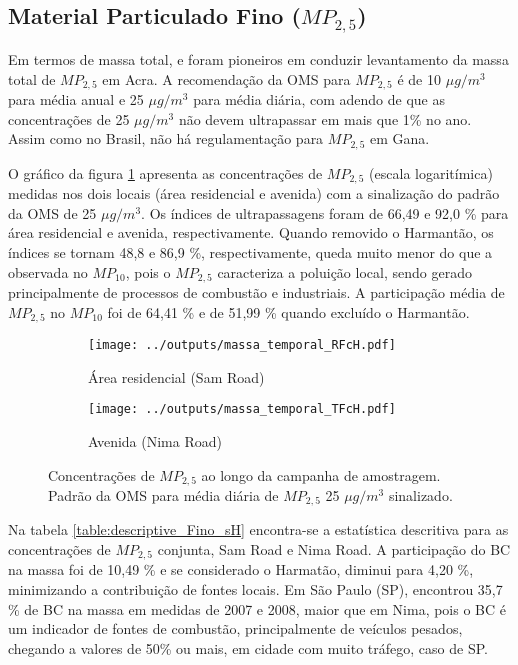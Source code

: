 \newpage
\subsection{Material Particulado Fino ($MP_{2,5}$)}

Em termos de massa total, \citet{ARKU2008} e \citet{DIONISIO2010} 
foram pioneiros em conduzir levantamento da massa total de $MP_{2,5}$ em 
Acra. A recomendação da OMS para $MP_{2,5}$ é de 10 $\mu g/m^3$ para média anual
e 25 $\mu g/m^3$ para média diária, com adendo de que as concentrações de 
25 $\mu g/m^3$ não devem ultrapassar em mais que 1\% no ano. Assim como no
Brasil, não há regulamentação para $MP_{2,5}$ em Gana. 

O gráfico da figura \ref{fig:massa_temporal_mp2.5} apresenta as concentrações
de $MP_{2,5}$ (escala logaritímica) medidas nos dois locais 
(área residencial e avenida) com a sinalização do padrão da OMS de 
25 $\mu g/m^3$. Os índices de ultrapassagens foram de 66,49 e 92,0 \% 
para área residencial e avenida, respectivamente. Quando removido o Harmantão, 
os índices se tornam 48,8 e 86,9 \%, respectivamente, queda muito menor do 
que a observada no $MP_{10}$, pois o $MP_{2,5}$ caracteriza a poluição local, 
sendo gerado principalmente de processos de combustão e industriais.
A participação média de $MP_{2,5}$ no $MP_{10}$ foi de 64,41 \% e de 
51,99 \% quando excluído o Harmantão.

\begin{figure}[H]
  \centering
  \begin{subfigure}[b]{0.45\textwidth}
    \texttt{[image: ../outputs/massa\_temporal\_RFcH.pdf]}
    \caption{Área residencial (Sam Road)}
  \end{subfigure}%
  \begin{subfigure}[b]{0.45\textwidth}
    \texttt{[image: ../outputs/massa\_temporal\_TFcH.pdf]}
    \caption{Avenida (Nima Road)}
  \end{subfigure}
  \caption{Concentrações de $MP_{2,5}$ ao longo da campanha de amostragem. 
           Padrão da OMS para média diária de $MP_{2,5}$ 25 $\mu g/m^3$ sinalizado.
           \label{fig:massa_temporal_mp2.5}}
\end{figure}

Na tabela \ref{table:descriptive_Fino_sH} encontra-se a estatística 
descritiva para as concentrações de $MP_{2,5}$ conjunta, Sam Road e Nima Road. 
A participação do BC na massa foi de 10,49 \% e se considerado 
o Harmatão, diminui para 4,20 \%, minimizando a contribuição de fontes locais.
Em São Paulo (SP), \citet{andrade2012} encontrou 35,7 \% de BC na massa em medidas
de 2007 e 2008, maior que em Nima, pois o BC é um indicador de fontes de 
combustão, principalmente de veículos pesados, chegando a valores de 50\% ou 
mais, em cidade com muito tráfego, caso de SP.

